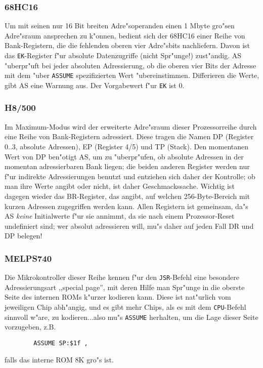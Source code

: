 \documentclass[12pt,a4paper,twoside]{report}
\newcommand{\tty}[1]{{\tt #1}}
\begin{document}
\subsubsection{68HC16}

Um mit seinen nur 16 Bit breiten Adre"soperanden einen 1 Mbyte gro"sen
Adre"sraum ansprechen zu k"onnen, bedient sich der 68HC16 einer Reihe
von Bank-Registern, die die fehlenden oberen vier Adre"sbits nachliefern.
Davon ist das \tty{EK}-Register f"ur absolute Datenzugriffe (nicht
Spr"unge!) zust"andig.  AS "uberpr"uft bei jeder absoluten Adressierung,
ob die oberen vier Bits der Adresse mit dem "uber \tty{ASSUME}
spezifizierten Wert "ubereinstimmen.  Differieren die Werte, gibt AS eine
Warnung aus.  Der Vorgabewert f"ur \tty{EK} ist 0.


\subsubsection{H8/500}

Im Maximum-Modus wird der erweiterte Adre"sraum dieser Prozessorreihe
durch eine Reihe von Bank-Registern adressiert.  Diese tragen die
Namen DP (Register 0..3, absolute Adressen), EP (Register 4/5) und
TP (Stack).  Den momentanen Wert von DP ben"otigt AS, um zu "uberpr"ufen,
ob absolute Adressen in der momentan adressierbaren Bank liegen;
die beiden anderen Register werden nur f"ur indirekte Adressierungen
benutzt und entziehen sich daher der Kontrolle; ob man ihre Werte
angibt oder nicht, ist daher Geschmackssache.  Wichtig ist dagegen
wieder das BR-Register, das angibt, auf welchen 256-Byte-Bereich
mit kurzen Adressen zugegriffen werden kann.  Allen Registern ist
gemeinsam, da"s AS {\em keine} Initialwerte f"ur sie annimmt, da sie nach
einem Prozessor-Reset undefiniert sind; wer absolut adressieren
will, mu"s daher auf jeden Fall DR und DP belegen!


\subsubsection{MELPS740}

Die Mikrokontroller dieser Reihe kennen f"ur den \tty{JSR}-Befehl eine
besondere Adressierungsart ,,special page'', mit deren Hilfe man Spr"unge
in die oberste Seite des internen ROMs k"urzer kodieren kann.  Diese
ist nat"urlich vom jeweiligen Chip abh"angig, und es gibt mehr Chips,
als es mit dem \tty{CPU}-Befehl sinnvoll w"are, zu kodieren...also mu"s
\tty{ASSUME} herhalten, um die Lage dieser Seite vorzugeben, z.B.
\begin{verbatim}
        ASSUME SP:$1f ,
\end{verbatim}
falls das interne ROM 8K gro"s ist.
\end{document}
